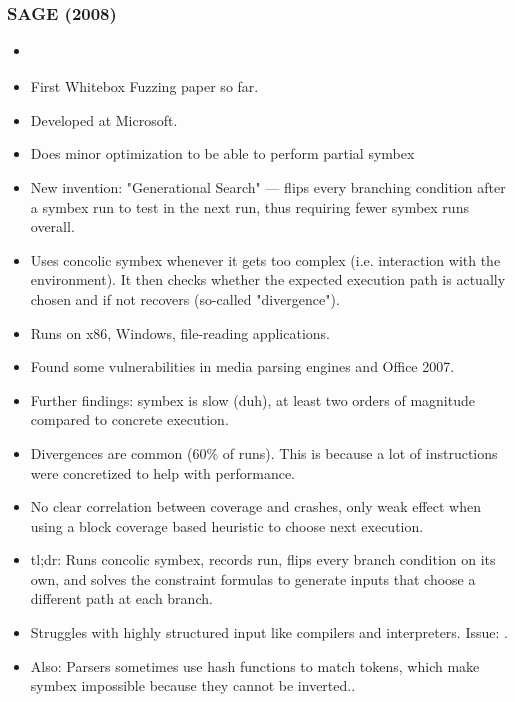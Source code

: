 \documentclass[12pt]{article}
\begin{document}
\subsubsection{SAGE (2008)}
\begin{itemize}
    \item \cite{SAGE}
    \item First Whitebox Fuzzing paper so far.
    \item Developed at Microsoft.
    \item Does minor optimization to be able to perform partial symbex
    \item New invention: "Generational Search" — flips every branching condition after a symbex run to test in the next run, thus requiring fewer symbex runs overall.
    \item Uses concolic symbex whenever it gets too complex (i.e. interaction with the environment). It then checks whether the expected execution path is actually chosen and if not recovers (so-called "divergence").
    \item Runs on x86, Windows, file-reading applications.
    \item Found some vulnerabilities in media parsing engines and Office 2007.
    \item Further findings: symbex is slow (duh), at least two orders of magnitude compared to concrete execution.
    \item Divergences are common (60\% of runs). This is because a lot of instructions were concretized to help with performance.
    \item No clear correlation between coverage and crashes, only weak effect when using a block coverage based heuristic to choose next execution.
    \item tl;dr: Runs concolic symbex, records run, flips every branch condition on its own, and solves the constraint formulas to generate inputs that choose a different path at each branch.
    \item Struggles with highly structured input like compilers and interpreters. Issue: \cite{GrammarBasedWhiteboxFuzzing}.
    \item Also: Parsers sometimes use hash functions to match tokens, which make symbex impossible because they cannot be inverted.\cite{GrammarBasedWhiteboxFuzzing}.
\end{itemize}
\end{document}
